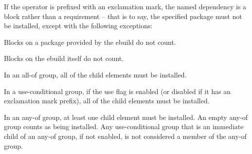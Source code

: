 If the operator is prefixed with an exclamation mark, the named dependency is a block
rather than a requirement -- that is to say, the specified package must not be
installed, except with the following exceptions:

\begin{bulletlist}
\item Blocks on a package provided by the ebuild do not count.
\item Blocks on the ebuild itself do not count.
\end{bulletlist}

In an all-of group, all of the child elements must be installed.

In a use-conditional group, if the use flag is enabled (or disabled if it has an exclamation mark
prefix), all of the child elements must be installed.

In an any-of group, at least one child element must be installed. An empty any-of group
counts as being installed. Any use-conditional group that is an immediate child of an
any-of group, if not enabled, is not considered a member of the any-of group.

